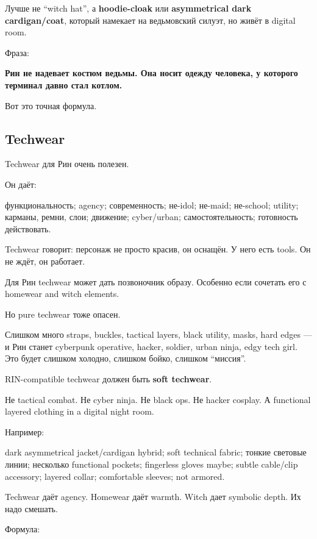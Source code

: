 Лучше не ``witch hat'', а \textbf{hoodie-cloak} или \textbf{asymmetrical
dark cardigan/\hspace{0pt}coat}, который намекает на ведьмовский силуэт, но живёт в
digital room.

Фраза:

\textbf{Рин не надевает костюм ведьмы. Она носит одежду человека, у
которого терминал давно стал котлом.}

Вот это точная формула.

\subsection*{Techwear}

Techwear для Рин очень полезен.

Он даёт:

функциональность; agency; современность; не-idol; не-maid; не-school;
utility; карманы, ремни, слои; движение; cyber/\hspace{0pt}urban; самостоятельность;
готовность действовать.

Techwear говорит: персонаж не просто красив, он оснащён. У него есть
tools. Он не ждёт, он работает.

Для Рин techwear может дать позвоночник образу. Особенно если сочетать
его с homewear and witch elements.

Но pure techwear тоже опасен.

Слишком много straps, buckles, tactical layers, black utility, masks,
hard edges --- и Рин станет cyberpunk operative, hacker, soldier, urban
ninja, edgy tech girl. Это будет слишком холодно, слишком бойко, слишком
``миссия''.

RIN-compatible techwear должен быть \textbf{soft techwear}.

Не tactical combat. Не cyber ninja. Не black ops. Не hacker cosplay. А
functional layered clothing in a digital night room.

Например:

dark asymmetrical jacket/\hspace{0pt}cardigan hybrid; soft technical fabric; тонкие
световые линии; несколько functional pockets; fingerless gloves maybe;
subtle cable/\hspace{0pt}clip accessory; layered collar; comfortable sleeves; not
armored.

Techwear даёт agency. Homewear даёт warmth. Witch дает symbolic depth.
Их надо смешать.

Формула:

